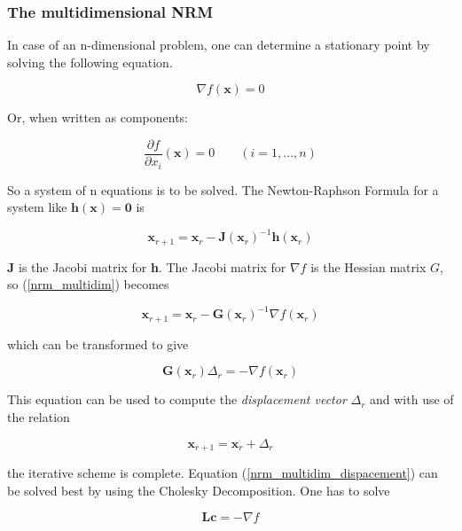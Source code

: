 \documentclass[a4paper,14pt]{extbook}
\begin{document}
\subsubsection{The multidimensional NRM}
In case of an n-dimensional problem, one can determine a stationary point by solving the following equation.

\begin{equation}
\nabla f(\textbf{x})=0
\end{equation}


Or, when written as components:

\begin{equation}
\frac{\partial f}{\partial x_i}(\textbf{x})=0 \qquad(i=1,...,n)
\end{equation}

So a system of n equations is to be solved. The Newton-Raphson Formula for a system like $\textbf{h}(\textbf{x})=\textbf{0}$ is

\begin{equation}
\textbf{x}_{r+1}=\textbf{x}_r-\textbf{J}(\textbf{x}_r)^{-1}\textbf{h} (\textbf{x}_r) \label{nrm_multidim}
\end{equation}

\textbf{J} is the Jacobi matrix for \textbf{h}. The Jacobi matrix for $\nabla f$ is the Hessian matrix $G$, so (\ref{nrm_multidim}) becomes

\begin{equation}
\textbf{x}_{r+1}=\textbf{x}_r-\textbf{G}(\textbf{x}_r)^{-1}\nabla f(\textbf{x}_r)
\end{equation}

which can be transformed to give

\begin{equation}
\textbf{G}(\textbf{x}_r)\Delta_r=-\nabla f (\textbf{x}_r ) \label{nrm_multidim_dispacement}
\end{equation}

This equation can be used to compute the \emph{displacement vector} $\Delta_r $ and with use of the relation

\begin{equation}
\textbf{x}_{r+1}=\textbf{x}_r + \Delta_r
\end{equation}

the iterative scheme is complete. Equation (\ref{nrm_multidim_dispacement}) can be solved best by using the Cholesky Decomposition. One has to solve

\begin{equation}
\textbf{Lc}=-\nabla f
\end{equation}
\end{document}
